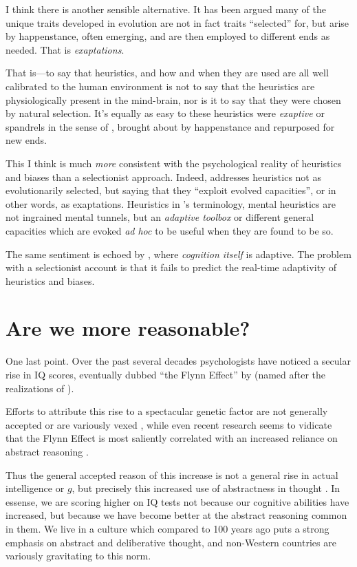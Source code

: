 \documentclass{article}
\begin{document}
I think there is another sensible alternative.
It has been argued \parencite{massimo89,gould91} many of the unique traits developed in evolution are not in fact traits ``selected'' for, but arise by happenstance, often emerging, and are then employed to different ends as needed.
That is \textit{exaptations}.

That is---to say that heuristics, and how and when they are used are all well calibrated to the human environment is not to say that the heuristics are physiologically present in the mind-brain, nor is it to say that they were chosen by natural selection.
It's equally as easy to these heuristics were \emph{exaptive} \parencite{buss98} or spandrels in the sense of \textcite{gould79}, brought about by happenstance and repurposed for new ends.

This I think is much \emph{more} consistent with the psychological reality of heuristics and biases than a selectionist approach.
Indeed, \textcite{gigerenzer08} addresses heuristics not as evolutionarily selected, but saying that they ``exploit evolved capacities'', or in other words, as exaptations.
Heuristics in \textcite{gigerenzer08}'s terminology, mental heuristics are not ingrained mental tunnels, but an \emph{adaptive toolbox} or different general capacities which are evoked \emph{ad hoc} to be useful when they are found to be so.

The same sentiment is echoed by \textcite{anderson90}, where \emph{cognition itself} is adaptive.
The problem with a selectionist account is that it fails to predict the real-time adaptivity of heuristics and biases.

\section{Are we more reasonable?}

One last point.
Over the past several decades psychologists have noticed a secular rise in IQ scores, eventually dubbed ``the Flynn Effect'' by \textcite{herrnstein94} (named after the realizations of \textcite{flynn87}).

Efforts to attribute this rise to a spectacular genetic factor are not generally accepted or are variously vexed \parencite{woodley11}, while even recent research seems to vidicate that the Flynn Effect is most saliently correlated with an increased reliance on abstract reasoning \parencite{must16}.

Thus the general accepted reason of this increase is not a general rise in actual intelligence or $g$, but precisely this increased use of abstractness in thought \parencite{flynn07}.
In essense, we are scoring higher on IQ tests not because our cognitive abilities have increased, but because we have become better at the abstract reasoning common in them.
We live in a culture which compared to 100 years ago puts a strong emphasis on abstract and deliberative thought, and non-Western countries are variously gravitating to this norm.
\end{document}
